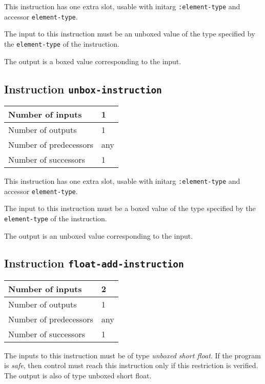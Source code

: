 This instruction has one extra slot, usable with initarg
\texttt{:element-type} and accessor \texttt{element-type}.

The input to this instruction must be an unboxed value of the type
specified by the \texttt{element-type} of the instruction.

The output is a boxed value corresponding to the input.

\subsection{Instruction \texttt{unbox-instruction}}
\label{mir-instruction-unbox}

\begin{tabular}{|l|l|}
\hline
Number of inputs & 1\\
\hline
Number of outputs & 1\\
\hline
Number of predecessors & any\\
\hline
Number of successors & 1\\
\hline
\end{tabular}

This instruction has one extra slot, usable with initarg
\texttt{:element-type} and accessor \texttt{element-type}.

The input to this instruction must be a boxed value of the type
specified by the \texttt{element-type} of the instruction.

The output is an unboxed value corresponding to the input.

\subsection{Instruction \texttt{float-add-instruction}}
\label{mir-instruction-float-add}

\begin{tabular}{|l|l|}
\hline
Number of inputs & 2\\
\hline
Number of outputs & 1\\
\hline
Number of predecessors & any\\
\hline
Number of successors & 1\\
\hline
\end{tabular}

The inputs to this instruction must be of type \emph{unboxed short
  float}.  If the program is \emph{safe}, then control must reach this
instruction only if this restriction is verified.  The output is also
of type unboxed short float.

